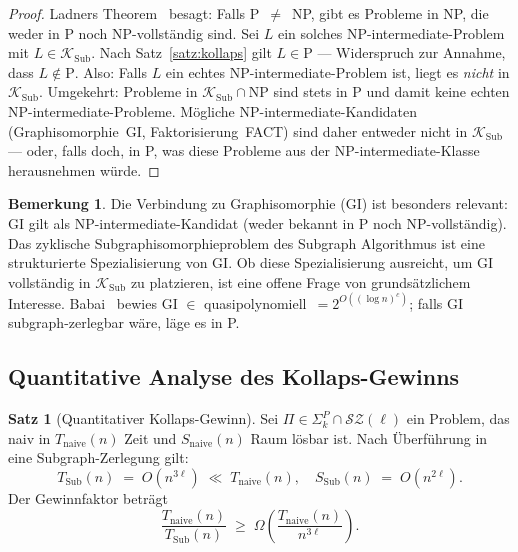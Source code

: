 ﻿\documentclass[a4paper,12pt]{article}
\theoremstyle{definition}
\newtheorem{satz}{Satz}
\newtheorem{bemerkung}{Bemerkung}
\begin{document}
\begin{proof}
  Ladners Theorem~\cite{ladner1975structure} besagt: Falls P~$\neq$~NP, gibt es
  Probleme in NP, die weder in P noch NP-vollständig sind.
  Sei $L$ ein solches NP-intermediate-Problem mit $L \in \mathcal{K}_\mathrm{Sub}$.
  Nach Satz~\ref{satz:kollaps} gilt $L \in \mathrm{P}$ --- Widerspruch zur Annahme,
  dass $L \notin \mathrm{P}$.
  Also: Falls $L$ ein echtes NP-intermediate-Problem ist, liegt es \emph{nicht}
  in $\mathcal{K}_\mathrm{Sub}$.
  Umgekehrt: Probleme in $\mathcal{K}_\mathrm{Sub} \cap \mathrm{NP}$ sind stets in P
  und damit keine echten NP-intermediate-Probleme.
  Mögliche NP-intermediate-Kandidaten (Graphisomorphie~GI, Faktorisierung~FACT)
  sind daher entweder nicht in $\mathcal{K}_\mathrm{Sub}$ --- oder, falls doch,
  in P, was diese Probleme aus der NP-intermediate-Klasse herausnehmen würde.
\end{proof}

\begin{bemerkung}
  Die Verbindung zu Graphisomorphie (GI) ist besonders relevant:
  GI gilt als NP-intermediate-Kandidat (weder bekannt in P noch NP-vollständig).
  Das zyklische Subgraphisomorphieproblem des Subgraph Algorithmus ist
  eine strukturierte Spezialisierung von GI.
  Ob diese Spezialisierung ausreicht, um GI vollständig in $\mathcal{K}_\mathrm{Sub}$
  zu platzieren, ist eine offene Frage von grundsätzlichem Interesse.
  Babai~\cite{babai2016graph} bewies GI $\in$ quasipolynomiell~$= 2^{O((\log n)^c)}$;
  falls GI subgraph-zerlegbar wäre, läge es in P.
\end{bemerkung}

\subsection{Quantitative Analyse des Kollaps-Gewinns}

\begin{satz}[Quantitativer Kollaps-Gewinn]
\label{satz:quant}
  Sei $\Pi \in \Sigma_k^P \cap \mathcal{SZ}(\ell)$ ein Problem, das naiv in
  $T_{\mathrm{naive}}(n)$ Zeit und $S_{\mathrm{naive}}(n)$ Raum lösbar ist.
  Nach Überführung in eine Subgraph-Zerlegung gilt:
  \[
    T_{\mathrm{Sub}}(n) \;=\; O(n^{3\ell}) \;\ll\; T_{\mathrm{naive}}(n),
    \quad
    S_{\mathrm{Sub}}(n) \;=\; O(n^{2\ell}).
  \]
  Der Gewinnfaktor beträgt
  \[
    \frac{T_{\mathrm{naive}}(n)}{T_{\mathrm{Sub}}(n)} \;\geq\; \Omega\!\left(\frac{T_{\mathrm{naive}}(n)}{n^{3\ell}}\right).
  \]
\end{satz}
\end{document}
